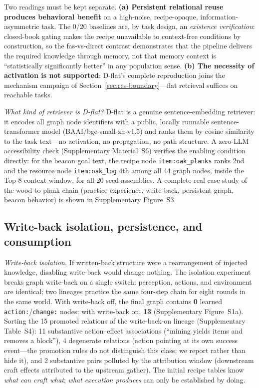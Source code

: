\documentclass[10pt]{article}
\begin{document}
Two readings must be kept separate. \textbf{(a) Persistent relational reuse produces behavioral benefit} on a high-noise, recipe-opaque, information-asymmetric task. The 0/20 baselines are, by task design, an \emph{existence verification}: closed-book gating makes the recipe unavailable to context-free conditions by construction, so the fas-vs-direct contrast demonstrates that the pipeline delivers the required knowledge through memory, not that memory context is ``statistically significantly better'' in any population sense. \textbf{(b) The necessity of activation is not supported}: D-flat's complete reproduction joins the mechanism campaign of Section~\ref{sec:res-boundary}---flat retrieval suffices on reachable tasks.

\emph{What kind of retriever is D-flat?} D-flat is a genuine sentence-embedding retriever: it encodes all graph node identifiers with a public, locally runnable sentence-transformer model (BAAI/bge-small-zh-v1.5) and ranks them by cosine similarity to the task text---no activation, no propagation, no path structure. A zero-LLM accessibility check (Supplementary Material~S6) verifies the enabling condition directly: for the beacon goal text, the recipe node \texttt{item:oak\_planks} ranks 2nd and the resource node \texttt{item:oak\_log} 4th among all 44 graph nodes, inside the Top-8 context window, for all 20 seed assemblies. A complete real case study of the wood-to-plank chain (practice experience, write-back, persistent graph, beacon behavior) is shown in Supplementary Figure~S3.

\subsection{Write-back isolation, persistence, and consumption}
\label{sec:res-persist}

\emph{Write-back isolation.} If written-back structure were a rearrangement of injected knowledge, disabling write-back would change nothing. The isolation experiment breaks graph write-back on a single switch: perception, actions, and environment are identical; two lineages practice the same four-step chain for eight rounds in the same world. With write-back off, the final graph contains \textbf{0} learned \texttt{action:}/\texttt{change:} nodes; with write-back on, \textbf{13} (Supplementary Figure~S1a). Sorting the 15 promoted relations of the write-back-on lineage (Supplementary Table~S4): 11 substantive action--effect associations (``mining yields items and removes a block''), 4 degenerate relations (action pointing at its own success event---the promotion rules do not distinguish this class; we report rather than hide it), and 2 substantive pairs polluted by the attribution window (downstream craft effects attributed to the upstream gather). The initial recipe tables know \emph{what can craft what}; \emph{what execution produces} can only be established by doing.
\end{document}

